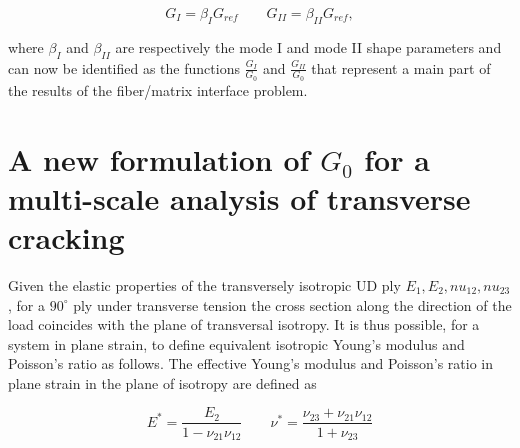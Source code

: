 \documentclass[a4paper]{jpconf}
\begin{document}
\begin{equation}
G_{I}=\beta_{I} G_{ref}\qquad G_{II}=\beta_{II} G_{ref},
\end{equation}

where $\beta_{I}$ and $\beta_{II}$ are respectively the mode I and mode II shape parameters and can now be identified as the functions $\frac{G_{I}}{G_{0}}$ and $\frac{G_{II}}{G_{0}}$ that represent a main part of the results of the fiber/matrix interface problem.


\section{A new formulation of $G_{0}$ for a multi-scale analysis of transverse cracking}

Given the elastic properties of the transversely isotropic UD ply $E_{1},E_{2},nu_{12},nu_{23}$, for a $90^{\circ}$ ply under transverse tension the cross section along the direction of the load coincides with the plane of transversal isotropy. It is thus possible, for a system in plane strain, to define equivalent isotropic Young's modulus and Poisson's ratio as follows. The effective Young's modulus and Poisson's ratio in plane strain in the plane of isotropy are defined as

\begin{equation}
E^{*}=\frac{E_{2}}{1-\nu_{21}\nu_{12}}\qquad\nu^{*}=\frac{\nu_{23}+\nu_{21}\nu_{12}}{1+\nu_{23}}
\end{equation}






\end{document}
